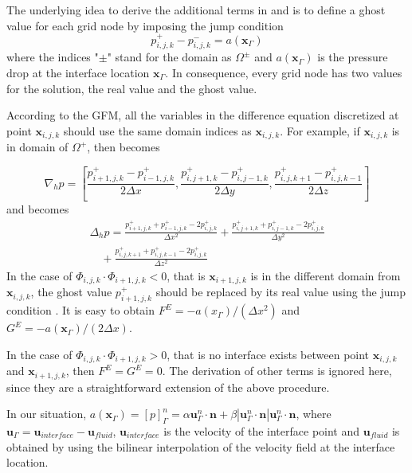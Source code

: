 The underlying idea to derive the additional terms in  and
 is to define a ghost value for each grid node by imposing the jump
condition
\begin{equation} p_{i,j,k}^+ - p_{i,j,k}^- = a(\mathbf{x}_{\Gamma})
\label{disJump} \end{equation} where the indices "$\pm$" stand for the domain as
$\Omega^{\pm}$ and $a(\mathbf{x}_{\Gamma})$ is the pressure drop at the
interface location $\mathbf{x}_{\Gamma}$.  In consequence, every grid node has
two values for the solution, the real value and the ghost value.

According to the GFM, all the variables in the difference equation discretized
at point $\mathbf{x}_{i,j,k}$ should use the same domain indices as $\mathbf{x}_{i,j,k}$.
For example, if $\mathbf{x}_{i,j,k}$ is in domain of $\Omega^+$, then  becomes

\begin{equation} \label{ghostGradP} \nabla_h p =
[\frac{p^+_{i+1,j,k}-p^+_{i-1,j,k}}{2\Delta x},
\frac{p^+_{i,j+1,k}-p^+_{i,j-1,k}}{2\Delta y},
\frac{p^+_{i,j,k+1}-p^+_{i,j,k-1}}{2\Delta z}] \end{equation} and 
becomes
\begin{equation} \label{ghostLapP} 
\begin{aligned} \Delta_h p =
\frac{p^+_{i+1,j,k}+p^+_{i-1,j,k}-2p^+_{i,j,k}}{\Delta x^2} +
\frac{p^+_{i,j+1,k}+p^+_{i,j-1,k}-2p^+_{i,j,k}}{\Delta y^2} \\ \quad
+\frac{p^+_{i,j,k+1}+p^+_{i,j,k-1}-2p^+_{i,j,k}}{\Delta z^2} \end{aligned}
\end{equation}
In the case of $\Phi_{i,j,k} \cdot \Phi_{i+1,j,k} < 0$, that is
$\mathbf{x}_{i+1,j,k}$ is in the different domain from $\mathbf{x}_{i,j,k}$,
the ghost value $p^+_{i+1,j,k}$ should be replaced by its real value using the
jump condition . It is easy to obtain
$F^E = -a(x_{\Gamma})/(\Delta x^2)$ and $G^E = -a(\mathbf{x}_{\Gamma})/(2\Delta x)$.

In the case of $\Phi_{i,j,k}\cdot\Phi_{i+1,j,k} > 0$, that is no interface exists between point $\mathbf{x}_{i,j,k}$ and $\mathbf{x}_{i+1,j,k}$, then $F^E = G^E = 0$.  The derivation of other terms is ignored here, since they are a straightforward extension of the above procedure.

In our situation, $a(\mathbf{x}_{\Gamma}) = [p]^n_{\Gamma} = \alpha
\mathbf{u}_{\Gamma}^n\cdot \mathbf{n} + \beta|\mathbf{u}_{\Gamma}^n\cdot
\mathbf{n}| \mathbf{u}_{\Gamma}^n\cdot \mathbf{n}$, where $\mathbf{u}_{\Gamma} =
\mathbf{u}_{interface} - \mathbf{u}_{fluid}$, $\mathbf{u}_{interface}$ is the
velocity of the interface point and $\mathbf{u}_{fluid}$ is obtained by using
the bilinear interpolation of the velocity field at the interface location.

